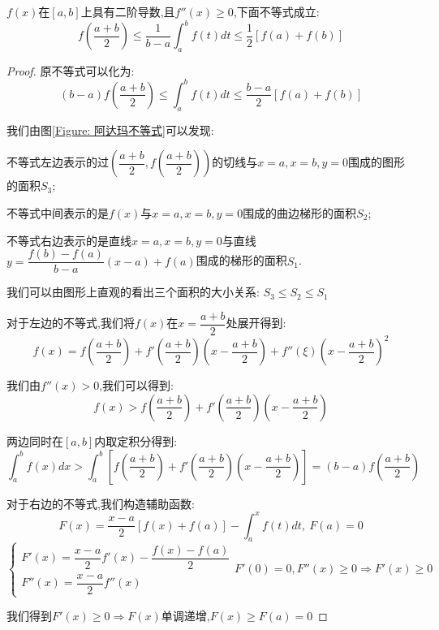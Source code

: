 \begin{theorem}\label{thm: 阿达玛不等式}

	$f(x)$在$[a,b]$上具有二阶导数,且$f''(x)\geq 0$,下面不等式成立:  
	$$f(\dfrac{a+b}{2})\leq \dfrac{1}{b-a}\int_{a}^{b}f(t)dt\leq \dfrac{1}{2}[f(a)+f(b)]$$
	\begin{proof}
		
		原不等式可以化为:  
		$$(b-a)f(\dfrac{a+b}{2})\leq\int_{a}^{b}f(t)dt\leq\dfrac{b-a}{2}[f(a)+f(b)]$$
		
		我们由图\ref{Figure: 阿达玛不等式}可以发现:  
		
		不等式左边表示的过$(\dfrac{a+b}{2},f(\dfrac{a+b}{2}))$的切线与$x=a,x=b,y=0$围成的图形的面积$S_{3}$;
		
		不等式中间表示的是$f(x)$与$x=a,x=b,y=0$围成的曲边梯形的面积$S_{2}$;
		
		不等式右边表示的是直线$x=a,x=b,y=0$与直线$y=\dfrac{f(b)-f(a)}{b-a}(x-a)+f(a)$围成的梯形的面积$S_{1}$.
		
		我们可以由图形上直观的看出三个面积的大小关系:  $S_{3}\leq S_{2}\leq S_{1}$
		
		对于左边的不等式,我们将$f(x)$在$x=\dfrac{a+b}{2}$处展开得到:  
		$$f(x)=f(\dfrac{a+b}{2})+f'(\dfrac{a+b}{2})(x-\dfrac{a+b}{2})+f''(\xi)(x-\dfrac{a+b}{2})^2$$
		
		我们由$f''(x)>0$,我们可以得到:  
		$$f(x)>f(\dfrac{a+b}{2})+f'(\dfrac{a+b}{2})(x-\dfrac{a+b}{2})$$
		
		两边同时在$[a,b]$内取定积分得到:  
		$$\int_{a}^{b}f(x)dx>\int_{a}^{b}[f(\dfrac{a+b}{2})+f'(\dfrac{a+b}{2})(x-\dfrac{a+b}{2})]=(b-a)f(\dfrac{a+b}{2})$$
		
		对于右边的不等式,我们构造辅助函数:  
		$$F(x)=\dfrac{x-a}{2}[f(x)+f(a)]-\int_{a}^{x}f(t)dt,\ F(a)=0$$
		$$\left\lbrace
		\begin{array}{l}
			F'(x)=\dfrac{x-a}{2}f'(x)-\dfrac{f(x)-f(a)}{2}\\
			F''(x)=\dfrac{x-a}{2}f''(x)
		\end{array}
		\right. F'(0)=0,F''(x)\geq 0\Rightarrow F'(x)\geq 0$$
		
		我们得到$F'(x)\geq 0\Rightarrow F(x)\text{单调递增}$,$F(x)\geq F(a)=0$
	\end{proof}
\end{theorem}
